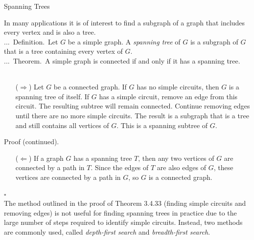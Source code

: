\documentclass[smaller,hyperref={CJKbookmarks=true}]{beamer}
\newenvironment{PROOF}{{\noindent\!\sf\alert{Proof.}}\\}{\hfill$\square$\\}
\newcounter{zhuo}[subsection]
\renewcommand{\thezhuo}{\thesection.\thesubsection.\arabic{zhuo}}
\newenvironment{DEFINITION}{\stepcounter{zhuo}\alert{\thezhuo.~Definition.\,}}{}
\newenvironment{THEOREM}{\stepcounter{zhuo}\alert{\thezhuo.~Theorem.\,}}{}
\begin{document}
\begin{frame}{Spanning Trees}
\begin{spacing}{1.1}
In many applications it is of interest to find a subgraph of a graph that
includes every vertex and is also a tree.\\[6pt]
\begin{DEFINITION}
Let $G$ be a simple graph. A \emph{spanning tree} of $G$ is a
subgraph of $G$ that is a tree containing every vertex of $G$.\\[6pt]
\end{DEFINITION}
\begin{THEOREM}
A simple graph is connected if and only if it has a
spanning tree.\\[8pt]
\end{THEOREM}
\begin{PROOF}
\begin{itemize}
  \item[($\Rightarrow$)] Let $G$ be a connected graph. If $G$ has no simple circuits, then $G$ is a spanning tree of itself. If $G$ has a simple circuit, remove an edge from this circuit. The resulting subtree will remain connected. Continue removing edges until there are no more simple circuits. The result is a subgraph that is a tree and still contains all vertices of $G$. This is a spanning subtree of $G$.
\end{itemize}
\newpage
\vspace*{9pt}
\alert{Proof (continued).}\\
\begin{itemize}
  \item[($\Leftarrow$)] If a graph $G$ has a spanning tree $T$, then any two vertices of $G$ are connected by a path in $T$. Since the edges of $T$ are also edges of $G$, these vertices are connected by a path in $G$, so $G$ is a connected graph.
\end{itemize}
\end{PROOF}
\vspace*{7pt}
The method outlined in the proof of Theorem 3.4.33 (finding simple
circuits and removing edges) is not useful for finding spanning trees in
practice due to the large number of steps required to identify simple
circuits. Instead, two methods are commonly used, called \emph{depth-first
search} and \emph{breadth-first search}.
\end{spacing}
\end{frame}
\end{document}
